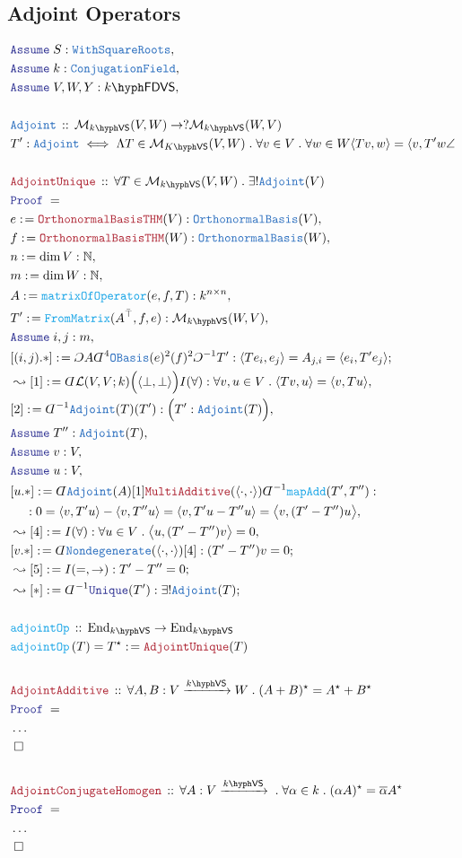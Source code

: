 \documentclass[12pt]{scrartcl}%
\newcommand{\TYPE}[1]{\textcolor{NavyBlue}{\mathtt{#1}}}%
\newcommand{\FUNC}[1]{\textcolor{Cerulean}{\mathtt{#1}}}%
\newcommand{\LOGIC}[1]{\textcolor{Blue}{\mathtt{#1}}}%
\newcommand{\THM}[1]{\textcolor{Maroon}{\mathtt{#1}}}%
\renewcommand{\.}{\; . \;} %
\newcommand{\de}{: \kern 0.1pc =} %
\newcommand{\Act}[1]{\left( #1 \right)} %
\newcommand{\Theorem}[2]{& \THM{#1} \, :: \, #2 \\ & \Proof = \\ } %
\newcommand{\DeclareType}[2]{& \TYPE{#1} \, :: \, #2 \\}%
\newcommand{\DefineType}[3]{& #1 : \TYPE{#2} \iff #3 \\}%
\newcommand{\DeclareFunc}[2]{& \FUNC{#1} \, :: \, #2 \\}%
\newcommand{\DefineNamedFunc}[4]{&  \FUNC{#1}\Act{#2} = #3 \de #4 \\}%
\newcommand{\NewLine}{\\ & \kern 1pc}%
\newcommand{\Page}[1]{ \begin{align*} #1 \end{align*}  }%
\newcommand{ \bd }{ \ByDef }%
\newcommand{\NoProof}{ & \ldots \\ \EndProof}%
\newcommand{\Nat}{\mathbb{N}}%
\newcommand{\Mor}{\mathcal{M}}%
\newcommand{\End}{\mathrm{End}}%
\newcommand{\Say}[3]{& #1 \de #2 : #3, \\} %
\newcommand{\Conclude}[3]{& #1 \de #2 : #3; \\}%
\newcommand{\Derive}[3]{& \leadsto #1 \de #2 : #3, \\} %
\newcommand{\DeriveConclude}[3]{& \leadsto #1 \de #2 : #3 ; \\} %
\newcommand{\Assume}[2]{& \LOGIC{Assume} \; #1 : #2, \\} %
\newcommand{\QED}{\; \square} %
\newcommand{\EndProof}{& \QED \\} %
\newcommand{\ByDef}{\rotatebox[origin=c]{-180}{$D$}}%
\newcommand{\ByConstr}{\rotatebox[origin=c]{-180}{$C$}}%
\newcommand{\Proof}{\LOGIC{Proof} \; } %
\newcommand{\Arrow}[1]{\xrightarrow{#1}}%
\newcommand{\OBasis}{\TYPE{OrthonormalBasis}}
\newcommand{\VS}[1]{#1\hyph\mathsf{VS}} %
\newcommand{\FDVS}[1]{#1\hyph\mathsf{FDVS}} %
\renewcommand{\L}{\mathcal{L}}
\begin{document}
\subsection{Adjoint Operators}
\Page{
	\Assume{S}{\TYPE{WithSquareRoots}}
	\Assume{k}{\TYPE{ConjugationField}}
	\Assume{V,W,Y}{\FDVS{k}}
	\\
	\DeclareType{Adjoint}{ \Mor_{\VS{k}}(V,W) \to ?\Mor_{\VS{k}}(W,V) }
	\DefineType{T'}{Adjoint}{ \Lambda T \in \Mor_{\VS{K}}(V,W) \. \forall v\in V \. \forall w \in W \langle Tv, w \rangle = \langle v, T'w\angle}
	\\
	\Theorem{AdjointUnique}{ \forall T \in \Mor_{\VS{k}}(V,W) \. \exists! \TYPE{Adjoint}(V)}
	\Say{e}{\THM{OrthonormalBasisTHM}(V)}{\OBasis(V)}
	\Say{f}{\THM{OrthonormalBasisTHM}(W)}{\OBasis(W)}
	\Say{n}{\dim V}{\Nat}
	\Say{m}{\dim W}{\Nat}
	\Say{A}{\FUNC{matrixOfOperator}(e,f,T)}{k^{n \times n}}
	\Say{T'}{\FUNC{FromMatrix}(A^{\bar \top},f,e)}{ \Mor_{\VS{k}}(W,V)  }
	\Assume{i,j}{m}
	\Conclude{[(i,j).*]}{ \ByConstr A \bd^4\TYPE{OBasis}(e)^2(f)^2  \ByConstr^{-1} T'   }{ \langle  Te_i, e_j  \rangle  = A_{j,i} =\langle e_i, T'e_j  \rangle} 
	\Derive{[1]}{\bd \L(V,V;k)\Big( \langle \bot, \bot \rangle \Big) I(\forall)}{ \forall v,u \in V  \. \langle Tv, u \rangle = \langle v, Tu \rangle}
	\Say{[2]}{\bd^{-1}\TYPE{Adjoint}(T)(T')}{ \Big(T' : \TYPE{Adjoint}(T) \Big) }
	\Assume{T''}{\TYPE{Adjoint}(T)}
	\Assume{v}{V}
	\Assume{u}{V}
	\Say{[u.*]}{ \bd \TYPE{Adjoint}(A)[1] \THM{MultiAdditive}(\langle \cdot,\cdot\rangle)\bd^{-1}\FUNC{mapAdd}(T',T'')}
	{ \NewLine :  0 = \langle v , T'u \rangle - \langle v, T''u \rangle = \langle v, T'u - T''u \rangle = \big\langle v, (T' - T'')u \big\rangle }
	\Derive{[4]}{I(\forall)}{\forall u \in V \. \big\langle u,(T'-T'')v \big\rangle = 0}
	\Conclude{[v.*]}{\bd \TYPE{Nondegenerate}(\langle \cdot, \cdot \rangle)[4]}{  (T' - T'')v = 0 }
	\DeriveConclude{[5]}{I(=,\to)}{T' - T'' = 0}
	\DeriveConclude{[*]}{\bd^{-1}\LOGIC{Unique}(T')}{\exists! \TYPE{Adjoint}(T)}
	\\
	\DeclareFunc{adjointOp}{ \End_{\VS{k}} \to \End_{\VS{k}}}
	\DefineNamedFunc{adjointOp}{T}{T^\star}{\THM{AdjointUnique}(T)}
	\\
	\Theorem{AdjointAdditive}{\forall A,B : V \Arrow{\VS{k}} W \. (A + B)^\star = A^\star + B^\star }
	\NoProof
	\\
	\Theorem{AdjointConjugateHomogen}{\forall A : V \Arrow{\VS{k}} \.  \forall \alpha \in k \. (\alpha  A)^\star = \overline{\alpha} A^\star}
	\NoProof
}
\end{document}
